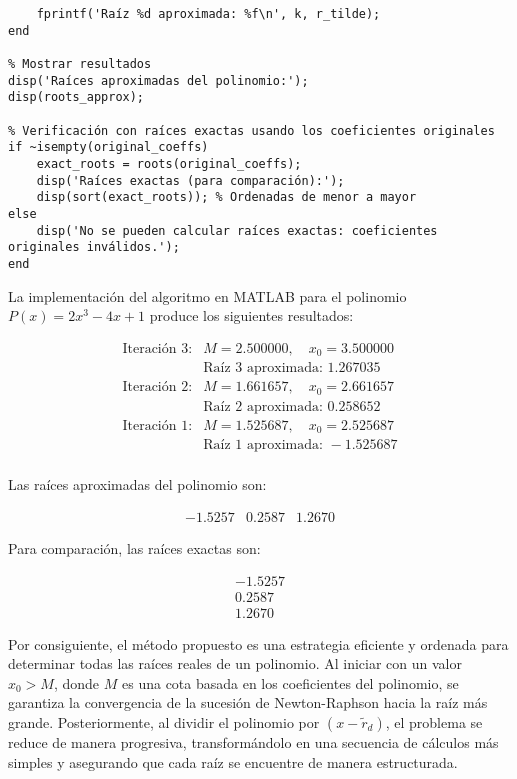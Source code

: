 \begin{homeworkProblem}
\begin{solucion}
\begin{itemize}
\begin{lstlisting}
    fprintf('Raíz %d aproximada: %f\n', k, r_tilde);
end

% Mostrar resultados
disp('Raíces aproximadas del polinomio:');
disp(roots_approx);

% Verificación con raíces exactas usando los coeficientes originales
if ~isempty(original_coeffs)
    exact_roots = roots(original_coeffs);
    disp('Raíces exactas (para comparación):');
    disp(sort(exact_roots)); % Ordenadas de menor a mayor
else
    disp('No se pueden calcular raíces exactas: coeficientes originales inválidos.');
end
  \end{lstlisting}
  La implementación del algoritmo en MATLAB para el polinomio \( P(x) = 2x^3 - 4x + 1 \) produce los siguientes resultados:

  \[
  \begin{array}{ll}
  \text{Iteración 3:} & M = 2.500000, \quad x_0 = 3.500000 \\
                       & \text{Raíz 3 aproximada: } 1.267035 \\[5pt]
  \text{Iteración 2:} & M = 1.661657, \quad x_0 = 2.661657 \\
                       & \text{Raíz 2 aproximada: } 0.258652 \\[5pt]
  \text{Iteración 1:} & M = 1.525687, \quad x_0 = 2.525687 \\
                       & \text{Raíz 1 aproximada: } -1.525687 \\[5pt]
  \end{array}
  \]

  Las raíces aproximadas del polinomio son:

  \[
  \begin{array}{ccc}
    -1.5257 & 0.2587 & 1.2670
  \end{array}
  \]    

  Para comparación, las raíces exactas son:

  \[
  \begin{array}{c}
  -1.5257 \\
  0.2587 \\
  1.2670
  \end{array}
  \]

  Por consiguiente, el método propuesto es una estrategia eficiente y ordenada para determinar todas las raíces reales de un polinomio. Al iniciar con un valor \( x_0 > M \), donde \( M \) es una cota basada en los coeficientes del polinomio, se garantiza la convergencia de la sucesión de Newton-Raphson hacia la raíz más grande. Posteriormente, al dividir el polinomio por \( (x - \tilde{r}_d) \), el problema se reduce de manera progresiva, transformándolo en una secuencia de cálculos más simples y asegurando que cada raíz se encuentre de manera estructurada.


\end{itemize}
\end{solucion}
\end{homeworkProblem}
